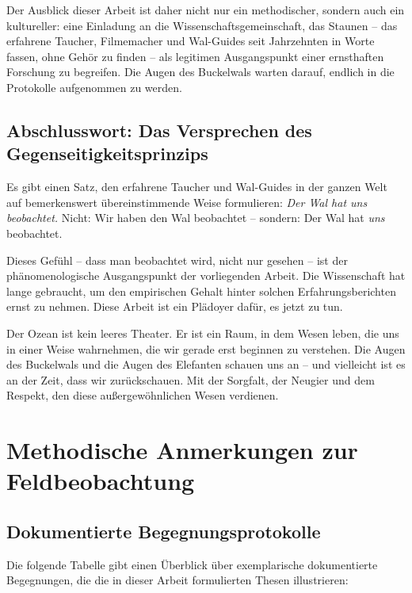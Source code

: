 ﻿\documentclass[12pt,a4paper]{article}
\theoremstyle{definition}
\theoremstyle{remark}
\begin{document}
Der Ausblick dieser Arbeit ist daher nicht nur ein methodischer, sondern auch ein kultureller: eine Einladung an die Wissenschaftsgemeinschaft, das Staunen -- das erfahrene Taucher, Filmemacher und Wal-Guides seit Jahrzehnten in Worte fassen, ohne Gehör zu finden -- als legitimen Ausgangspunkt einer ernsthaften Forschung zu begreifen. Die Augen des Buckelwals warten darauf, endlich in die Protokolle aufgenommen zu werden.

\subsection{Abschlusswort: Das Versprechen des Gegenseitigkeitsprinzips}

Es gibt einen Satz, den erfahrene Taucher und Wal-Guides in der ganzen Welt
auf bemerkenswert übereinstimmende Weise formulieren: \emph{Der Wal hat uns
beobachtet.} Nicht: Wir haben den Wal beobachtet -- sondern: Der Wal
hat \emph{uns} beobachtet.

Dieses Gefühl -- dass man beobachtet wird, nicht nur gesehen -- ist der
phänomenologische Ausgangspunkt der vorliegenden Arbeit. Die Wissenschaft hat
lange gebraucht, um den empirischen Gehalt hinter solchen Erfahrungsberichten
ernst zu nehmen. Diese Arbeit ist ein Plädoyer dafür, es jetzt zu tun.

Der Ozean ist kein leeres Theater. Er ist ein Raum, in dem Wesen leben,
die uns in einer Weise wahrnehmen, die wir gerade erst beginnen zu verstehen.
Die Augen des Buckelwals und die Augen des Elefanten schauen uns an -- und
vielleicht ist es an der Zeit, dass wir zurückschauen. Mit der Sorgfalt,
der Neugier und dem Respekt, den diese außergewöhnlichen Wesen verdienen.

\appendix
\section{Methodische Anmerkungen zur Feldbeobachtung}

\subsection{Dokumentierte Begegnungsprotokolle}

Die folgende Tabelle gibt einen Überblick über exemplarische dokumentierte
Begegnungen, die die in dieser Arbeit formulierten Thesen illustrieren:
\end{document}
